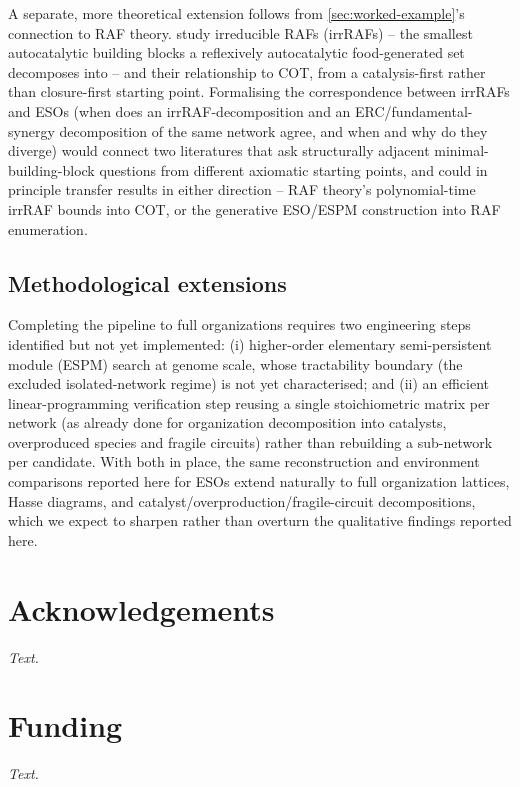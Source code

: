 \documentclass[nocrop]{bioinfo}
\begin{document}
A separate, more theoretical extension follows from \cref{sec:worked-example}'s connection to
RAF theory. \citet{steel2013minimal} study irreducible RAFs (irrRAFs) -- the smallest
autocatalytic building blocks a reflexively autocatalytic food-generated set decomposes into --
and their relationship to COT, from a catalysis-first rather than closure-first starting point.
Formalising the correspondence between irrRAFs and ESOs (when does an irrRAF-decomposition and
an ERC/fundamental-synergy decomposition of the same network agree, and when and why do they
diverge) would connect two literatures that ask structurally adjacent minimal-building-block
questions from different axiomatic starting points, and could in principle transfer results in
either direction -- RAF theory's polynomial-time irrRAF bounds \citep{steel2013minimal} into
COT, or the generative ESO/ESPM construction into RAF enumeration.

\subsection{Methodological extensions}
Completing the pipeline to full organizations requires two engineering steps identified but not
yet implemented: (i) higher-order elementary semi-persistent module (ESPM) search at genome
scale, whose tractability boundary (the excluded isolated-network regime) is not yet
characterised; and (ii) an efficient linear-programming verification step reusing a single
stoichiometric matrix per network (as already done for organization decomposition into
catalysts, overproduced species and fragile circuits) rather than rebuilding a sub-network per
candidate. With both in place, the same reconstruction and environment comparisons reported
here for ESOs extend naturally to full organization lattices, Hasse diagrams, and
catalyst/overproduction/fragile-circuit decompositions, which we expect to sharpen rather than
overturn the qualitative findings reported here.

\section*{Acknowledgements}
\textit{Text.}

\section*{Funding}
\textit{Text.}



\end{document}
